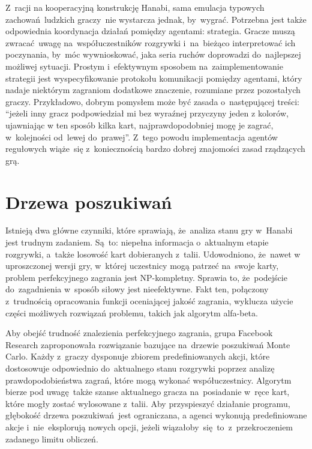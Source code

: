 \documentclass[declaration,shortabstract,inz]{iithesis}
\begin{document}
Z~racji na kooperacyjną konstrukcję Hanabi, sama emulacja typowych zachowań ludzkich graczy~nie wystarcza jednak, by~wygrać. Potrzebna jest także odpowiednia koordynacja działań pomiędzy agentami: strategia. Gracze muszą zwracać uwagę na~współuczestników rozgrywki i~na~bieżąco interpretować ich poczynania, by~móc wywnioskować, jaka seria ruchów doprowadzi do~najlepszej możliwej sytuacji. Prostym i~efektywnym sposobem na~zaimplementowanie strategii jest wyspecyfikowanie protokołu komunikacji pomiędzy agentami, który nadaje niektórym zagraniom dodatkowe znaczenie, rozumiane przez pozostałych graczy. Przykładowo, dobrym pomysłem może być zasada o~następującej treści: ``jeżeli inny gracz podpowiedział mi bez wyraźnej przyczyny jeden z kolorów, ujawniając w ten sposób kilka kart, najprawdopodobniej mogę je zagrać, w~kolejności od~lewej do~prawej''. Z~tego powodu implementacja agentów regułowych wiąże~się z~koniecznością bardzo dobrej znajomości zasad rządzących grą.

\section{Drzewa poszukiwań}

Istnieją dwa główne czynniki, które sprawiają, że~analiza stanu gry w~Hanabi jest trudnym zadaniem. Są~to: niepełna informacja o~aktualnym etapie rozgrywki, a~także losowość kart dobieranych z~talii. Udowodniono, że~nawet w uproszczonej wersji gry, w~której uczestnicy mogą patrzeć na~swoje karty, problem perfekcyjnego zagrania jest NP-kompletny\cite{NP-Complete}. Sprawia to, że~podejście do~zagadnienia w~sposób siłowy jest nieefektywne. Fakt ten, połączony z~trudnością opracowania funkcji oceniającej jakość zagrania, wyklucza użycie części możliwych rozwiązań problemu, takich jak algorytm alfa-beta.

Aby obejść trudność znalezienia perfekcyjnego zagrania, grupa Facebook Research zaproponowała rozwiązanie bazujące na~drzewie poszukiwań Monte Carlo\cite{MCTS}. Każdy z~graczy dysponuje zbiorem predefiniowanych akcji, które dostosowuje odpowiednio do~aktualnego stanu rozgrywki poprzez analizę prawdopodobieństwa zagrań, które mogą wykonać współuczestnicy. Algorytm bierze pod uwagę także szanse aktualnego gracza na~posiadanie w~ręce kart, które mogły zostać wylosowane z~talii. Aby przyspieszyć działanie programu, głębokość drzewa poszukiwań jest ograniczana, a agenci wykonują predefiniowane akcje i~nie~eksplorują nowych opcji, jeżeli wiązałoby~się to~z~przekroczeniem zadanego limitu obliczeń. 
\end{document}
